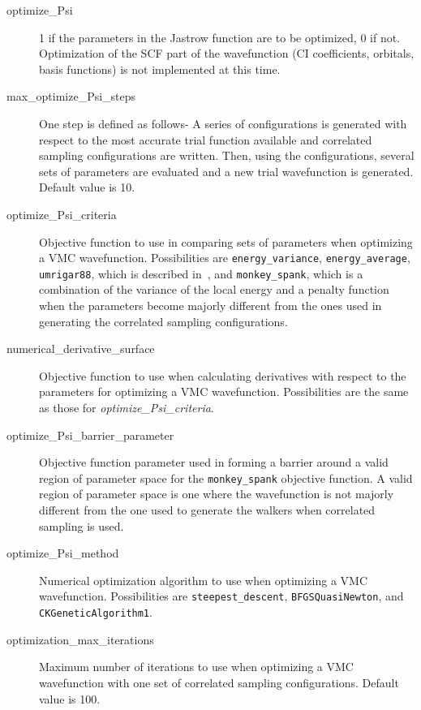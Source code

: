 \documentclass[11pt]{article}
\begin{document}
\begin{description}

\item [optimize\_Psi] 1 if the parameters in the Jastrow function are to
  be optimized, 0 if not.  Optimization of the SCF part of the
  wavefunction (CI coefficients, orbitals, basis functions) is not
  implemented at this time.  

\item [max\_optimize\_Psi\_steps] One step is defined as follows- A series
  of configurations is generated with respect to the most accurate
  trial function available and correlated sampling configurations are
  written.  Then, using the configurations, several sets of parameters
  are evaluated and a new trial wavefunction is generated.  Default
  value is 10.  

\item [optimize\_Psi\_criteria] Objective function to use in
  comparing sets of parameters when optimizing a VMC wavefunction.
  Possibilities are \verb-energy_variance-, \verb-energy_average-,
  \verb-umrigar88-, which is described in~\cite{UmrigarWilsonWilkins1988}, and
  \verb-monkey_spank-, which is a combination of the variance of the
  local energy and a penalty function when the parameters become
  majorly different from the ones used in generating the correlated
  sampling configurations.  

\item [numerical\_derivative\_surface] Objective function to use
  when calculating derivatives with respect to the parameters for
  optimizing a VMC wavefunction.  Possibilities are the same as those
  for \emph{optimize\_Psi\_criteria}.

\item [optimize\_Psi\_barrier\_parameter] Objective function
  parameter used in forming a barrier around a valid region of
  parameter space for the \verb-monkey_spank- objective function.  A
  valid region of parameter space is one where the wavefunction is not
  majorly different from the one used to generate the walkers when
  correlated sampling is used. 

\item [optimize\_Psi\_method] Numerical optimization algorithm to
  use when optimizing a VMC wavefunction.  Possibilities are
  \verb-steepest_descent-, \verb-BFGSQuasiNewton-, and
  \verb-CKGeneticAlgorithm1-. 

\item [optimization\_max\_iterations] Maximum number of iterations
  to use when optimizing a VMC wavefunction with one set of correlated
  sampling configurations.  Default value is 100.


\end{description}
\end{document}
